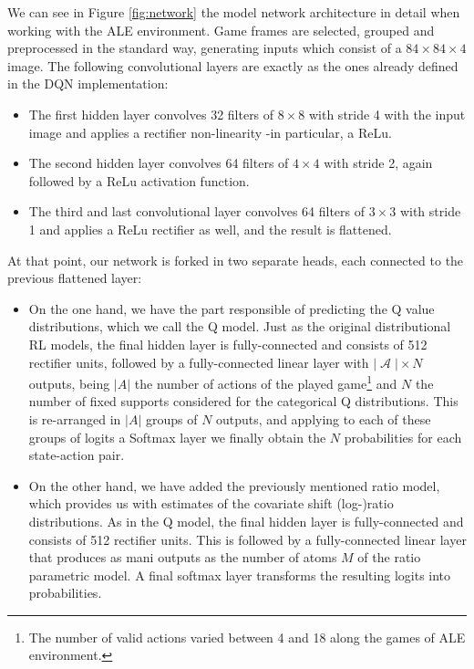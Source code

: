 \documentclass[12pt,a4paper,openright,twoside]{article}
\DeclareMathOperator*{\A}{\mathcal{A}}
\numberwithin{equation}{section}
\theoremstyle{definition}
\theoremstyle{remark}
\theoremstyle{plain}
\begin{document}
We can see in Figure \ref{fig:network} the model network architecture in detail when working with the ALE environment\cite{ALE}. Game frames are selected, grouped and preprocessed in the standard way, generating inputs which consist of a $84\times84\times4$ image. The following convolutional layers are exactly as the ones already defined in the DQN implementation\cite{DQN}:
\begin{itemize}
	\item The first hidden layer convolves 32 filters of $8\times8$ with stride 4 with the input image and applies a rectifier non-linearity -in particular, a ReLu\cite{ReLu}.
	\item The second hidden layer convolves 64 filters of $4\times4$ with stride 2, again followed by a ReLu activation function.
	\item The third and last convolutional layer convolves 64 filters of $3\times3$ with stride 1 and applies a ReLu rectifier as well, and the result is flattened.
\end{itemize}
At that point, our network is forked in two separate heads, each connected to the previous flattened layer:
\begin{itemize}
	\item On the one hand, we have the part responsible of predicting the Q value distributions, which we call the Q model. Just as the original distributional RL models\cite{DRL}, the final hidden layer is fully-connected and consists of 512 rectifier units, followed by a fully-connected linear layer with $| \A | \times N$ outputs, being $|A|$ the number of actions of the played game\footnote{The number of valid actions varied between 4 and 18 along the games of ALE environment.} and $N$ the number of fixed supports considered for the categorical Q distributions. This is re-arranged in $|A|$ groups of $N$ outputs, and applying to each of these groups of logits a Softmax layer we finally obtain the $N$ probabilities for each state-action pair.
	\item On the other hand, we have added the previously mentioned ratio model, which provides us with estimates of the covariate shift (log-)ratio distributions. As in the Q model, the final hidden layer is fully-connected and consists of 512 rectifier units. This is followed by a fully-connected linear layer that produces as mani outputs as the number of atoms $M$ of the ratio parametric model. A final softmax layer transforms the resulting logits into probabilities. 
\end{itemize}
\end{document}
